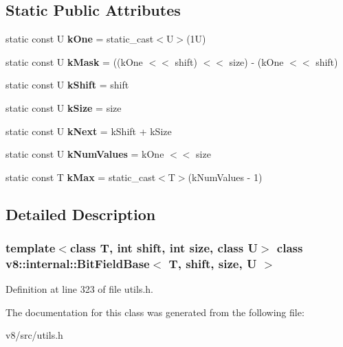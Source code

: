 \subsection*{Static Public Attributes}
\begin{DoxyCompactItemize}
\item 
\mbox{\label{classv8_1_1internal_1_1BitFieldBase_af2b0229ffee57c76f39b6a3aad6d22bb}} 
static const U {\bfseries k\+One} = static\+\_\+cast$<$U$>$(1\+U)
\item 
\mbox{\label{classv8_1_1internal_1_1BitFieldBase_a26880a1aa7d61fe08bcf77de9ca46b6f}} 
static const U {\bfseries k\+Mask} = ((k\+One $<$$<$ shift) $<$$<$ size) -\/ (k\+One $<$$<$ shift)
\item 
\mbox{\label{classv8_1_1internal_1_1BitFieldBase_a0b0c87744aa976ba62aadb4552e633ef}} 
static const U {\bfseries k\+Shift} = shift
\item 
\mbox{\label{classv8_1_1internal_1_1BitFieldBase_a73ac861af5e2f043ea3ef16bc102571b}} 
static const U {\bfseries k\+Size} = size
\item 
\mbox{\label{classv8_1_1internal_1_1BitFieldBase_ac924450272ea6ed882a43eba783d3488}} 
static const U {\bfseries k\+Next} = k\+Shift + k\+Size
\item 
\mbox{\label{classv8_1_1internal_1_1BitFieldBase_a2ee0d066ba3e49f43b4026993e5d0ce0}} 
static const U {\bfseries k\+Num\+Values} = k\+One $<$$<$ size
\item 
\mbox{\label{classv8_1_1internal_1_1BitFieldBase_a82aada63ffb94bf07ba4702ec9fc1525}} 
static const T {\bfseries k\+Max} = static\+\_\+cast$<$T$>$(k\+Num\+Values -\/ 1)
\end{DoxyCompactItemize}


\subsection{Detailed Description}
\subsubsection*{template$<$class T, int shift, int size, class U$>$\newline
class v8\+::internal\+::\+Bit\+Field\+Base$<$ T, shift, size, U $>$}



Definition at line 323 of file utils.\+h.



The documentation for this class was generated from the following file\+:\begin{DoxyCompactItemize}
\item 
v8/src/utils.\+h\end{DoxyCompactItemize}
